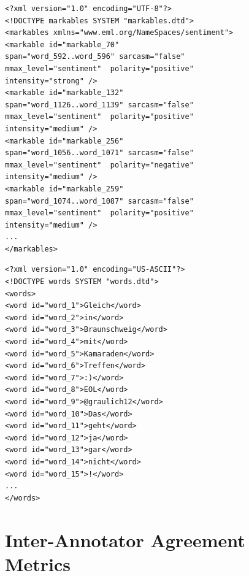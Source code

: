 \begin{minipage}[t]{\textwidth}
  \begin{minipage}[t]{0.45\textwidth}
    \lstset{language=XML}
    \begin{lstlisting}
<?xml version="1.0" encoding="UTF-8"?>
<!DOCTYPE markables SYSTEM "markables.dtd">
<markables xmlns="www.eml.org/NameSpaces/sentiment">
<markable id="markable_70"
span="word_592..word_596" sarcasm="false"
mmax_level="sentiment"  polarity="positive"
intensity="strong" />
<markable id="markable_132"
span="word_1126..word_1139" sarcasm="false"
mmax_level="sentiment"  polarity="positive"
intensity="medium" />
<markable id="markable_256"
span="word_1056..word_1071" sarcasm="false"
mmax_level="sentiment"  polarity="negative"
intensity="medium" />
<markable id="markable_259"
span="word_1074..word_1087" sarcasm="false"
mmax_level="sentiment"  polarity="positive"
intensity="medium" />
...
</markables>
    \end{lstlisting}%
  \end{minipage}\hfill%
  \begin{minipage}[t]{0.45\textwidth}%
    \lstset{language=XML}
    \begin{lstlisting}[basicstyle=\tiny]
<?xml version="1.0" encoding="US-ASCII"?>
<!DOCTYPE words SYSTEM "words.dtd">
<words>
<word id="word_1">Gleich</word>
<word id="word_2">in</word>
<word id="word_3">Braunschweig</word>
<word id="word_4">mit</word>
<word id="word_5">Kamaraden</word>
<word id="word_6">Treffen</word>
<word id="word_7">:)</word>
<word id="word_8">EOL</word>
<word id="word_9">@graulich12</word>
<word id="word_10">Das</word>
<word id="word_11">geht</word>
<word id="word_12">ja</word>
<word id="word_13">gar</word>
<word id="word_14">nicht</word>
<word id="word_15">!</word>
...
</words>
    \end{lstlisting}%
  \end{minipage}
\end{minipage}

\section{Inter-Annotator Agreement Metrics}\label{sec:snt:iaa}

